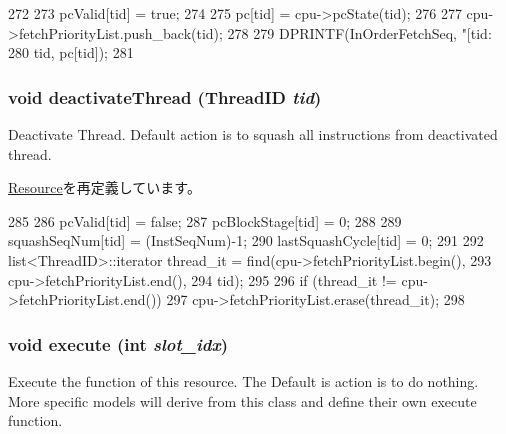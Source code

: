 \begin{DoxyCode}
272 {
273     pcValid[tid] = true;
274 
275     pc[tid] = cpu->pcState(tid);
276 
277     cpu->fetchPriorityList.push_back(tid);
278 
279     DPRINTF(InOrderFetchSeq, "[tid:%
280             tid, pc[tid]);
281 }
\end{DoxyCode}
\hypertarget{classFetchSeqUnit_ad11d9216ad92d9036ebf37844cf6e706}{
\subsubsection[{deactivateThread}]{\setlength{\rightskip}{0pt plus 5cm}void deactivateThread ({\bf ThreadID} {\em tid})}}
\label{classFetchSeqUnit_ad11d9216ad92d9036ebf37844cf6e706}
Deactivate Thread. Default action is to squash all instructions from deactivated thread. 

\hyperlink{classResource_ad11d9216ad92d9036ebf37844cf6e706}{Resource}を再定義しています。


\begin{DoxyCode}
285 {
286     pcValid[tid] = false;
287     pcBlockStage[tid] = 0;
288 
289     squashSeqNum[tid] = (InstSeqNum)-1;
290     lastSquashCycle[tid] = 0;
291 
292     list<ThreadID>::iterator thread_it = find(cpu->fetchPriorityList.begin(),
293                                               cpu->fetchPriorityList.end(),
294                                               tid);
295 
296     if (thread_it != cpu->fetchPriorityList.end())
297         cpu->fetchPriorityList.erase(thread_it);
298 }
\end{DoxyCode}
\hypertarget{classFetchSeqUnit_a7b7fff82f8c9cbdb02add1346f60bb9e}{
\subsubsection[{execute}]{\setlength{\rightskip}{0pt plus 5cm}void execute (int {\em slot\_\-idx})}}
\label{classFetchSeqUnit_a7b7fff82f8c9cbdb02add1346f60bb9e}
Execute the function of this resource. The Default is action is to do nothing. More specific models will derive from this class and define their own execute function. 

